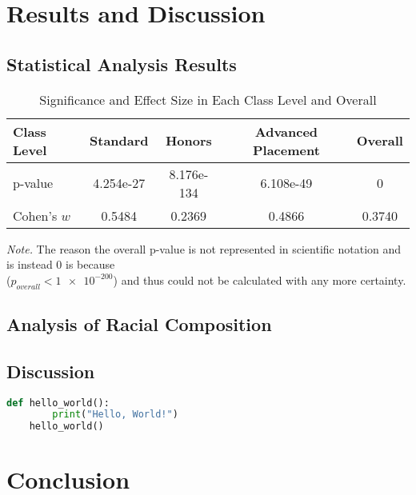 \documentclass{article}
\begin{document}
\section{Results and Discussion}
\subsection{Statistical Analysis Results}

\begin{table}[htbp]
\centering
\begin{threeparttable}
\caption{Significance and Effect Size in Each Class Level and Overall}
\label{tab:rt-errors}
\small
\begin{tabular}{l S S S S}
\toprule
Class Level & {Standard} & {Honors} & {Advanced Placement} & {Overall} \\
\midrule
p-value     & 4.254e-27 & 8.176e-134 & 6.108e-49 & 0 \\
Cohen's \(w\) & 0.5484 & 0.2369 & 0.4866 & 0.3740 \\
\bottomrule
\end{tabular}

\begin{tablenotes}[flushleft]\footnotesize
\item \textit{Note.} The reason the overall p-value is not represented in scientific notation and is instead 0 is because \\
($p_{overall} < \num{1e-200}$) and thus could not be calculated with any more certainty.
\end{tablenotes}
\end{threeparttable}
\end{table}

\subsection{Analysis of Racial Composition}
\subsection{Discussion}



    \begin{lstlisting}[language=Python]
    def hello_world():
        print("Hello, World!")
    hello_world()
    \end{lstlisting}
\section{Conclusion}
\end{document}
